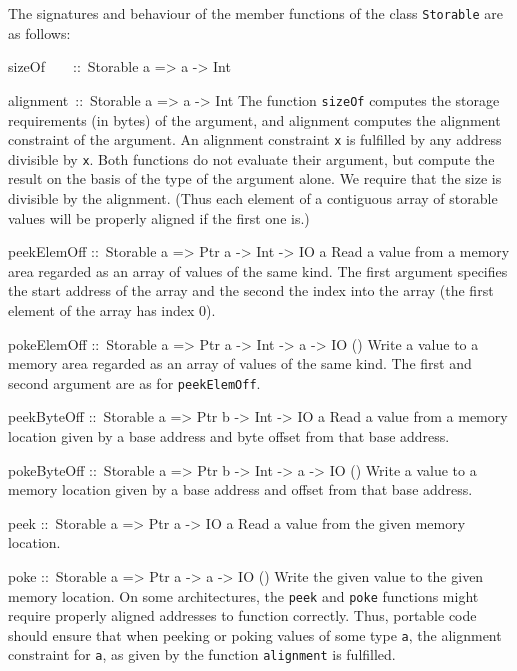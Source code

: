 \documentclass[a4paper,twoside]{article}
\makeatletter
\newcommand{\code}[1]{\texttt{#1}}      %
\newenvironment{codedesc}{%
  \list{}{\labelwidth\z@
    \let\makelabel\codedesclabel}
  }{%
  \endlist
  }
\newcommand*{\codedesclabel}[1]{%
  \hspace{-\leftmargin}
  \parbox[b]{\labelwidth}{\makebox[0pt][l]{\code{#1}}\\}\hfil\relax
  }
\newcommand{\combineitems}{\vspace*{-\itemsep}\vspace*{-\parsep}\vspace*{-1em}}
\makeatother
\begin{document}
The signatures and behaviour of the member functions of the class
\code{Storable} are as follows:
%
\begin{codedesc}
\item[sizeOf~~~~::\ Storable a => a -> Int]
\item[alignment~::\ Storable a => a -> Int]\combineitems The function
  \code{sizeOf} computes the storage requirements (in bytes) of the argument,
  and alignment computes the alignment constraint of the argument.  An
  alignment constraint \code{x} is fulfilled by any address divisible by
  \code{x}. Both functions do not evaluate their argument, but compute the
  result on the basis of the type of the argument alone.  We require that the
  size is divisible by the alignment.  (Thus each element of a contiguous
  array of storable values will be properly aligned if the first one is.)

\item[peekElemOff ::\ Storable a => Ptr a -> Int -> IO a] Read a value from a
  memory area regarded as an array of values of the same kind. The first
  argument specifies the start address of the array and the second the index
  into the array (the first element of the array has index 0).
  
\item[pokeElemOff ::\ Storable a => Ptr a -> Int -> a -> IO ()] Write a value
  to a memory area regarded as an array of values of the same kind.  The first
  and second argument are as for \code{peekElemOff}.
  
\item[peekByteOff ::\ Storable a => Ptr b -> Int -> IO a] Read a value from a
  memory location given by a base address and byte offset from that base
  address.
  
\item[pokeByteOff ::\ Storable a => Ptr b -> Int -> a -> IO ()] Write a value
  to a memory location given by a base address and offset from that base
  address.
  
\item[peek ::\ Storable a => Ptr a -> IO a] Read a value from the given memory
  location.
  
\item[poke ::\ Storable a => Ptr a -> a -> IO ()] Write the given value to the
  given memory location.
\end{codedesc}
%
On some architectures, the \code{peek} and \code{poke} functions might require
properly aligned addresses to function correctly.  Thus, portable code should
ensure that when peeking or poking values of some type \code{a}, the alignment
constraint for \code{a}, as given by the function \code{alignment} is
fulfilled.
\end{document}
